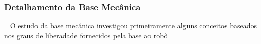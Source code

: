\subsubsection{Detalhamento da Base Mecânica}~\label{sec::base_mec}
O estudo da base mecânica investigou primeiramente alguns conceitos baseados nos
graus de liberadade fornecidos pela base ao robô
